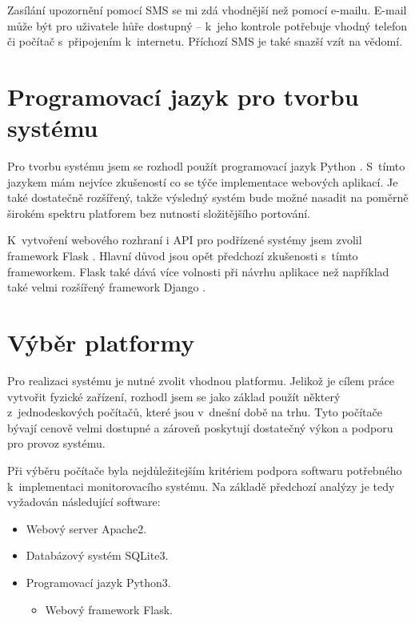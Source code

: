 Zasílání upozornění pomocí SMS se mi zdá vhodnější než pomocí e-mailu. E-mail může být pro uživatele hůře dostupný -- k~jeho kontrole potřebuje vhodný telefon či počítač s~připojením k~internetu. Příchozí SMS je také snazší vzít na vědomí.

\section{Programovací jazyk pro tvorbu systému}
\label{sec:an_lang}

Pro tvorbu systému jsem se rozhodl použít programovací jazyk Python \cite{python_tutorial}. S~tímto jazykem mám nejvíce zkušeností co se týče implementace webových aplikací. Je také dostatečně rozšířený, takže výsledný systém bude možné nasadit na poměrně širokém spektru platforem bez nutnosti složitějšího portování.

K~vytvoření webového rozhraní i API pro podřízené systémy jsem zvolil framework Flask \cite{flask_about}. Hlavní důvod jsou opět předchozí zkušenosti s~tímto frameworkem. Flask také dává více volnosti při návrhu aplikace než například také velmi rozšířený framework Django \cite{django_about}.

\section{Výběr platformy}
\label{sec:an_plat}

Pro realizaci systému je nutné zvolit vhodnou platformu. Jelikož je cílem práce vytvořit fyzické zařízení, rozhodl jsem se jako základ použít některý z~jednodeskových počítačů, které jsou v~dnešní době na trhu. Tyto počítače bývají cenově velmi dostupné a zároveň poskytují dostatečný výkon a podporu pro provoz systému.

Při výběru počítače byla nejdůležitejším kritériem podpora softwaru potřebného k~implementaci monitorovacího systému. Na základě předchozí analýzy je tedy vyžadován následující software:

\begin{itemize}
    \item Webový server Apache2.
    \item Databázový systém SQLite3.
    \item Programovací jazyk Python3.
    \begin{itemize}
        \item Webový framework Flask.
    \end{itemize}
\end{itemize}


